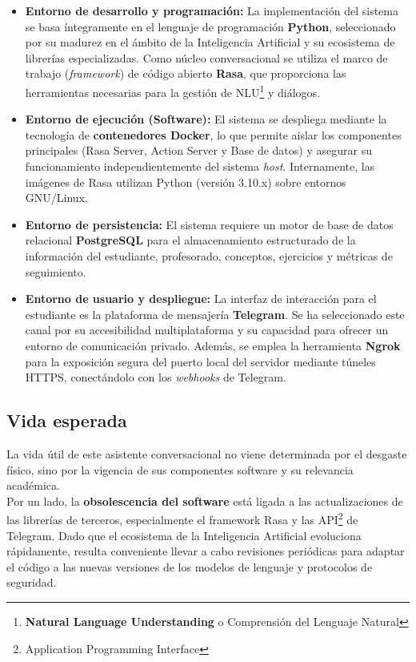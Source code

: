 \documentclass[a4paper,12pt,twoside,final]{book}
\begin{document}
\begin{itemize}
    \item \textbf{Entorno de desarrollo y programación:} La implementación del sistema se basa íntegramente en el lenguaje de programación \textbf{Python}, seleccionado por su madurez en el ámbito de la Inteligencia Artificial y su ecosistema de librerías especializadas. Como núcleo conversacional se utiliza el marco de trabajo (\textit{framework}) de código abierto \textbf{Rasa}, que proporciona las herramientas necesarias para la gestión de NLU\footnote{\textbf{Natural Language Understanding} o Comprensión del Lenguaje Natural} y diálogos.
    
    \item \textbf{Entorno de ejecución (Software):} El sistema se despliega mediante la tecnología de \textbf{contenedores Docker}, lo que permite aislar los componentes principales (Rasa Server, Action Server y Base de datos) y asegurar su funcionamiento independientemente del sistema \textit{host}. Internamente, las imágenes de Rasa utilizan Python (versión 3.10.x) sobre entornos GNU/Linux.
    
    \item \textbf{Entorno de persistencia:} El sistema requiere un motor de base de datos relacional \textbf{PostgreSQL} para el almacenamiento estructurado de la información del estudiante, profesorado, conceptos, ejercicios y métricas de seguimiento.
    
    \item \textbf{Entorno de usuario y despliegue:} La interfaz de interacción para el estudiante es la plataforma de mensajería \textbf{Telegram}. Se ha seleccionado este canal por su accesibilidad multiplataforma y su capacidad para ofrecer un entorno de comunicación privado. Además, se emplea la herramienta \textbf{Ngrok} para la exposición segura del puerto local del servidor mediante túneles HTTPS, conectándolo con los \textit{webhooks} de Telegram.
\end{itemize}

\subsection{Vida esperada}

La vida útil de este asistente conversacional no viene determinada por el desgaste físico, sino por la vigencia de sus componentes software y su relevancia académica.\\

Por un lado, la \textbf{obsolescencia del software} está ligada a las actualizaciones de las librerías de terceros, especialmente el framework Rasa y las API\footnote{Application Programming Interface} de Telegram. Dado que el ecosistema de la Inteligencia Artificial evoluciona rápidamente, resulta conveniente llevar a cabo revisiones periódicas para adaptar el código a las nuevas versiones de los modelos de lenguaje y protocolos de seguridad.\\
\end{document}
